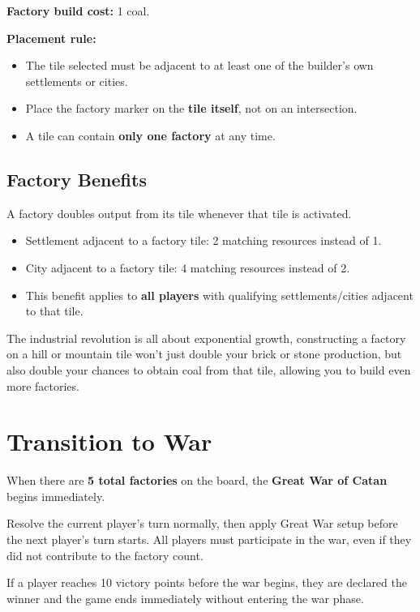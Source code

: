 \documentclass[12pt]{report}
\begin{document}
\textbf{Factory build cost:} 1 coal.

\textbf{Placement rule:}
\begin{itemize}[leftmargin=1.2cm]
  \item The tile selected must be adjacent to at least one of the builder's own settlements or cities.
  \item Place the factory marker on the \textbf{tile itself}, not on an intersection.
  \item A tile can contain \textbf{only one factory} at any time.
\end{itemize}

\section{Factory Benefits}
A factory doubles output from its tile whenever that tile is activated.

\begin{itemize}[leftmargin=1.2cm]
  \item Settlement adjacent to a factory tile: 2 matching resources instead of 1.
  \item City adjacent to a factory tile: 4 matching resources instead of 2.
  \item This benefit applies to \textbf{all players} with qualifying settlements/cities adjacent to that tile.
\end{itemize}

\begin{notebox}
  The industrial revolution is all about exponential growth, constructing a factory on a hill or mountain tile won't just double your brick or stone production, but also double your chances to obtain coal from that tile, allowing you to build even more factories.
\end{notebox}

\chapter{Transition to War}

When there are \textbf{5 total factories} on the board, the \textbf{Great War of Catan} begins immediately.

Resolve the current player's turn normally, then apply Great War setup before the next player's turn starts. All players must participate in the war, even if they did not contribute to the factory count.

If a player reaches 10 victory points before the war begins, they are declared the winner and the game ends immediately without entering the war phase.
\end{document}
